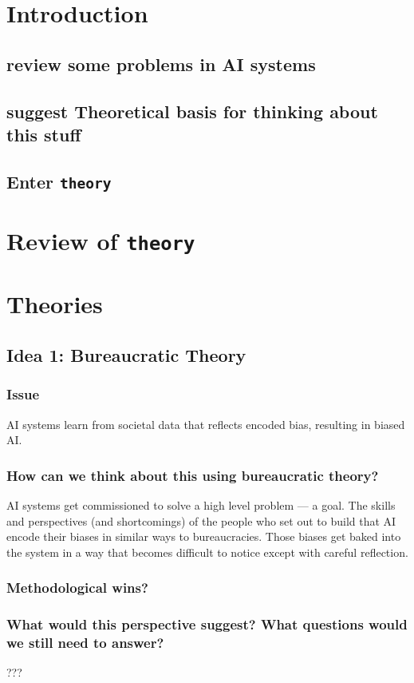 \documentclass[main]{subfiles}
\begin{document}
\section{Introduction}
\subsection{review some problems in AI systems}
\subsection{suggest Theoretical basis for thinking about this stuff}
\subsection{Enter \texttt{theory}}
\section{Review of \texttt{theory}}
\section{Theories}

\subsection{Idea 1: Bureaucratic Theory}
\subsubsection{Issue}
AI systems learn from societal data that reflects encoded bias, resulting in biased AI.

\subsubsection{How can we think about this using bureaucratic theory?}
AI systems get commissioned to solve a high level problem --- a goal.
The skills and perspectives (and shortcomings) of the people who set out to build that AI encode their biases in similar ways to bureaucracies.
Those biases get baked into the system in a way that becomes difficult to notice except with careful reflection.

\subsubsection{Methodological wins?}

\subsubsection{What would this perspective suggest? What questions would we still need to answer?}
???
\end{document}
